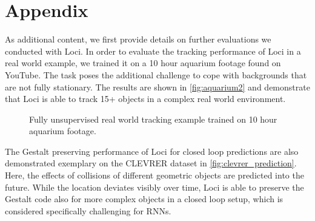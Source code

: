 \documentclass{article} \usepackage{iclr2023_conference_arxiv,times}
\def\imagepadding{0.2cm}
\def\imagepaddingy{0.15cm}
\begin{document}



\appendix
\clearpage
\section{Appendix}

As additional content, we first provide details on further evaluations we conducted with Loci. 
In order to evaluate the tracking performance of Loci in a real world example, we trained it on a 10 hour aquarium footage found on YouTube. The task poses the additional challenge to cope with backgrounds that are not fully stationary. The results are shown in \autoref{fig:aquarium2} and demonstrate that Loci is able to track 15+ objects in a complex real world environment.
\begin{figure*}[b!]
 \begin{elasticrow}[\imagepadding]
 \end{elasticrow}
 \vskip\imagepaddingy
 \begin{elasticrow}[\imagepadding]
 \end{elasticrow}
 \vskip\imagepaddingy
 \begin{elasticrow}[\imagepadding]
 \end{elasticrow}
 \caption{Fully unsupervised real world tracking example trained on 10 hour aquarium footage.} 
 \label{fig:aquarium2}
\end{figure*}

The Gestalt preserving performance of Loci for closed loop predictions are also demonstrated exemplary on the CLEVRER dataset in \autoref{fig:clevrer_prediction}. Here, the effects of collisions of different geometric objects are predicted into the future. While the location deviates  visibly over time, Loci is able to preserve the Gestalt code also for more complex objects in a closed loop setup, which is considered specifically challenging for RNNs.
\end{document}
